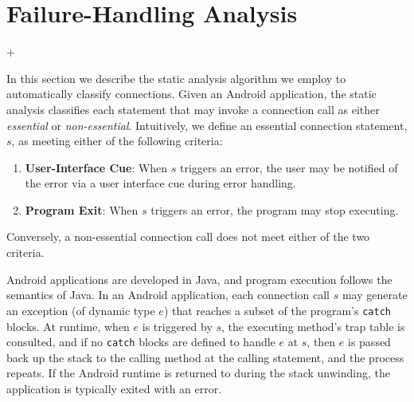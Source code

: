 \section{Failure-Handling Analysis}
\label{sec:analysis}

\lstMakeShortInline[basicstyle=\scriptsize\ttfamily,keywordstyle=\color{DarkPurple},breaklines=false]+

In this section we describe the static analysis algorithm we employ to
automatically classify connections.  Given an Android application, the
static analysis classifies each statement that may invoke a
connection call as either {\it essential} or {\it non-essential}.
Intuitively, we define an essential connection statement, $s$, as
meeting either of the following criteria:
\vspace{-0.05in}
\begin{enumerate}\setlength{\itemsep}{-0.05in}
\item{\bf User-Interface Cue}: When $s$ triggers an error, the user
may be notified of the error via a user interface cue during error
handling.
\item {\bf Program Exit}: When $s$ triggers an error, the program 
   may stop executing.  
\end{enumerate}
\vspace{-0.05in}
\noindent Conversely, a non-essential connection call does not meet
either of the two criteria.  

Android applications are developed in Java, and program execution
follows the semantics of Java. In an Android application, each
connection call $s$ may generate an exception (of dynamic type $e$)
that reaches a subset of the program's \lstinline!catch! blocks.  At
runtime, when $e$ is triggered by $s$, the executing method's trap
table is consulted, and if no \lstinline!catch! blocks are defined to
handle $e$ at $s$, then $e$ is passed back up the stack to the
calling method at the calling statement, and the process repeats.  If
the Android runtime is returned to during the stack unwinding, the
application is typically exited with an error.  


